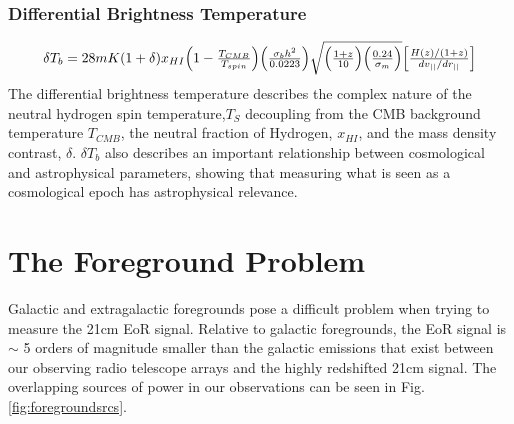 \documentclass[a0,landscape]{a0poster}
\begin{document}
\begin{multicols}{4}
\subsubsection*{Differential Brightness Temperature}
\begin{equation}
\label{difftemp}
\resizebox{.9\hsize}{!}{$
\delta T_{b} = 28mK(1+\delta)x_{HI}\Big(1-\frac{T_{CMB}}{T_{spin}}\Big)\Big(\frac{\sigma_{b}h^2}{0.0223}\Big)\sqrt{\Big(\frac{1+z}{10}\Big)\Big(\frac{0.24}{\sigma_m}\Big)}\Big[ \frac{H(z)/(1+z)}{dv_{||}/dr_{||}}\Big]$}
\end{equation}
The differential brightness temperature describes the complex nature of the neutral hydrogen spin temperature,$T_S$ decoupling from the CMB background temperature $T_{CMB}$, the neutral fraction of Hydrogen, $x_{HI}$, and the mass density contrast, $\delta$.
$\delta T_b$ also describes an important relationship between cosmological and astrophysical parameters, showing that measuring what is seen as a cosmological epoch has astrophysical relevance. 


\color{DarkSlateGray} %
\section*{The Foreground Problem} %
Galactic and extragalactic foregrounds pose a difficult problem when trying to measure the 21cm EoR signal. Relative to galactic foregrounds, the EoR signal is $\sim$ 5 orders of magnitude smaller than the galactic emissions that exist between our observing radio telescope arrays and the highly redshifted 21cm signal. The overlapping sources of power in our observations can be seen in Fig. \ref{fig:foregroundsrcs}.



\end{multicols}
\end{document}
